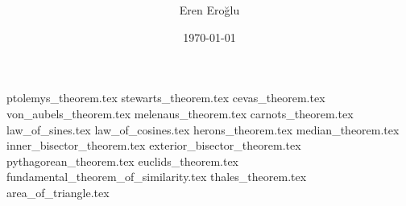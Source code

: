 \documentclass[a4paper, 10pt]{report}
\author{Eren Eroğlu}
\date{\today}
\title{
	\en{Formulas}
	\tr{Formüller}
}
\newcommand{\refresh}{
	\pagestyle{fancy}
	\fancyhf{}
	\lhead{\thepage}
}
\begin{document}
\refresh
\maketitle
\tableofcontents

\chapter{
 }

{ptolemys_theorem.tex}
{stewarts_theorem.tex}
{cevas_theorem.tex}
{von_aubels_theorem.tex}
{melenaus_theorem.tex}
{carnots_theorem.tex}
{law_of_sines.tex}
{law_of_cosines.tex}
{herons_theorem.tex}
{median_theorem.tex}
{inner_bisector_theorem.tex}
{exterior_bisector_theorem.tex}
{pythagorean_theorem.tex}
{euclids_theorem.tex}
{fundamental_theorem_of_similarity.tex}
{thales_theorem.tex}
{area_of_triangle.tex}
\end{document}
